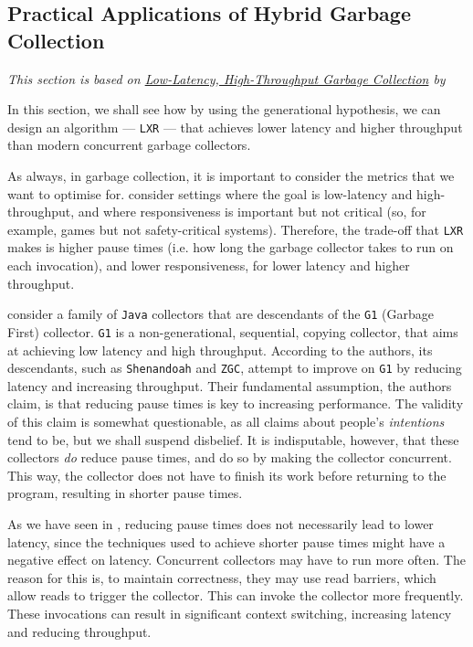 \subsection{Practical Applications of Hybrid Garbage Collection\optional}
\textit{This section is based on \href{https://dl.acm.org/doi/pdf/10.1145/3519939.3523440}{Low-Latency, High-Throughput Garbage Collection} by} \citet{zhao-2022}

In this section, we shall see how by using the generational hypothesis, we can design an algorithm --- \texttt{LXR} --- that achieves lower latency and higher throughput than modern concurrent garbage collectors.

As always, in garbage collection, it is important to consider the metrics that we want to optimise for. \citet{zhao-2022} consider settings where the goal is low-latency and high-throughput, and where responsiveness is important but not critical (so, for example, games but not safety-critical systems). Therefore, the trade-off that \texttt{LXR} makes is higher pause times (i.e. how long the garbage collector takes to run on each invocation), and lower responsiveness, for lower latency and higher throughput. 

\citet{zhao-2022} consider a family of \texttt{Java} collectors that are descendants of the \texttt{G1} (Garbage First) collector. \texttt{G1} is a non-generational, sequential, copying collector, that aims at achieving low latency and high throughput. According to the authors, its descendants, such as \texttt{Shenandoah} and \texttt{ZGC}, attempt to improve on \texttt{G1} by reducing latency and increasing throughput. Their fundamental assumption, the authors claim, is that reducing pause times is key to increasing performance. The validity of this claim is somewhat questionable, as all claims about people's \textit{intentions} tend to be, but we shall suspend disbelief. It is indisputable, however, that these collectors \textit{do} reduce pause times, and do so by making the collector concurrent. This way, the collector does not have to finish its work before returning to the program, resulting in shorter pause times. 

As we have seen in , reducing pause times does not necessarily lead to lower latency, since the techniques used to achieve shorter pause times might have a negative effect on latency. Concurrent collectors may have to run more often. The reason for this is, to maintain correctness, they may use read barriers, which allow reads to trigger the collector. This can invoke the collector more frequently. These invocations can result in significant context switching, increasing latency and reducing throughput.

